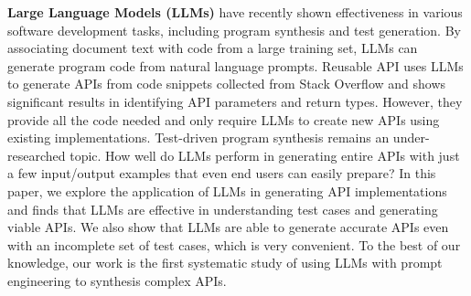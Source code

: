 \textbf{Large Language Models (LLMs)} have recently shown effectiveness in various software development tasks, including program synthesis\cite{jain2022jigsaw} and test generation\cite{xia2024fuzz4all,jiang2024generating}. By associating document text with code from a large training set, LLMs can generate program code from natural language prompts\cite{jain2022jigsaw,ugare2024improving,spiess2024quality,wang2023large}. Reusable API\cite{reuseableAPI} uses LLMs to generate APIs from code snippets collected from Stack Overflow and shows significant results in identifying API parameters and return types. However, they provide all the code needed and only require LLMs to create new APIs using existing implementations. Test-driven program synthesis remains an under-researched topic. How well do LLMs perform in generating entire APIs with just a few input/output examples that even end users can easily prepare? In this paper, we explore the application of LLMs in generating API implementations and finds that LLMs are effective in understanding test cases and generating viable APIs. We also show that LLMs are able to generate accurate APIs even with an incomplete set of test cases, which is very convenient. To the best of our knowledge, our work is the first systematic study of using LLMs with prompt engineering to synthesis complex APIs.

%